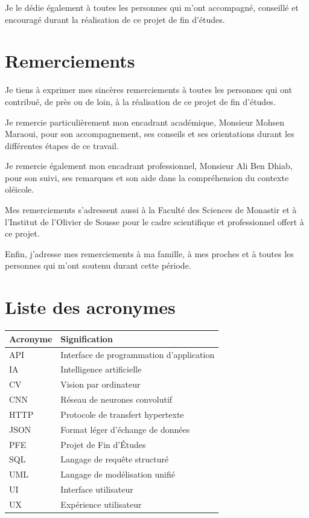 \documentclass[12pt,a4paper]{report}
\begin{document}
Je le dédie également à toutes les personnes qui m'ont accompagné, conseillé et encouragé durant la réalisation de ce projet de fin d'études.

\chapter*{Remerciements}

Je tiens à exprimer mes sincères remerciements à toutes les personnes qui ont contribué, de près ou de loin, à la réalisation de ce projet de fin d'études.

Je remercie particulièrement mon encadrant académique, Monsieur Mohsen Maraoui, pour son accompagnement, ses conseils et ses orientations durant les différentes étapes de ce travail.

Je remercie également mon encadrant professionnel, Monsieur Ali Ben Dhiab, pour son suivi, ses remarques et son aide dans la compréhension du contexte oléicole.

Mes remerciements s'adressent aussi à la Faculté des Sciences de Monastir et à l'Institut de l'Olivier de Sousse pour le cadre scientifique et professionnel offert à ce projet.

Enfin, j'adresse mes remerciements à ma famille, à mes proches et à toutes les personnes qui m'ont soutenu durant cette période.

\tableofcontents
\listoftables
\listoffigures

\chapter*{Liste des acronymes}

\begin{center}
\begin{tabular}{|p{3cm}|p{10cm}|}
\hline
\textbf{Acronyme} & \textbf{Signification} \\
\hline
API & Interface de programmation d'application \\
\hline
IA & Intelligence artificielle \\
\hline
CV & Vision par ordinateur \\
\hline
CNN & Réseau de neurones convolutif \\
\hline
HTTP & Protocole de transfert hypertexte \\
\hline
JSON & Format léger d'échange de données \\
\hline
PFE & Projet de Fin d'Études \\
\hline
SQL & Langage de requête structuré \\
\hline
UML & Langage de modélisation unifié \\
\hline
UI & Interface utilisateur \\
\hline
UX & Expérience utilisateur \\
\hline
\end{tabular}
\end{center}
\end{document}
